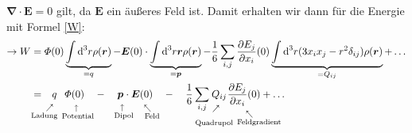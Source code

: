 \documentclass[titlepage,11pt,a4paper,ngerman]{report}
\newcommand{\tx}[1]{\textrm{#1}}
\newcommand{\dd}{\tx{d}}
\newcommand{\custo}[3]{\underset{\scriptstyle\overset{\mkern4mu\rotatebox{-90}{$\,#1$}}{#3}}{#2}}
\renewcommand{\Phi}{\varPhi}
\renewcommand{\vec}[1]{\boldsymbol{#1}}
\begin{document}
$ \vec{\nabla} \cdot \vec{E} = 0 $ gilt, da $ \vec{E} $ ein äußeres Feld ist.
Damit erhalten wir dann für die Energie mit Formel \eqref{W}:
\begin{align*}
\rightarrow W &= \Phi(0)\underbrace{\int\dd^3r\rho(\vec{r})}_{=q}-\vec{E}(0)\cdot\underbrace{\int\dd^3r\vec{r}\rho(\vec{r})}_{=\vec{p}}-\frac{1}{6}\sum_{i,j}\frac{\partial E_j}{\partial x_i}(0)\underbrace{\int\dd^3r(3x_ix_j-r^2\delta_{ij})\rho(\vec{r})}_{=Q_{ij}}+\ldots \\
&= \custo{\substack{\vspace{10pt}\\ \nwarrow} }{q}{\mathclap{\tx{Ladung}}\qquad} \custo{\substack{\leftarrow}}{\Phi(0)}{\ \ \mathclap{\tx{Potential}}} \quad - \quad \custo{\substack{\leftarrow}}{\vec{p}}{\ \ \mathclap{\tx{Dipol}}} \cdot \custo{\substack{\swarrow\\ \vspace{5pt}}}{\vec{E}(0)}{\qquad \mathclap{\tx{Feld}}} \quad - \quad \frac{1}{6} \sum_{i,j} 
\custo{\substack{\vspace{7pt} \\ \nwarrow}}{Q_{ij}}{\mathclap{\substack{\\[5pt]\tx{Quadrupol}}} \quad} \custo{\substack{\swarrow \\ \vspace{5pt}}}{\frac{\partial E_j}{\partial x_i} (0)}{\qquad \quad \mathclap{\tx{Feldgradient}}} + \ldots
\end{align*}
\end{document}
